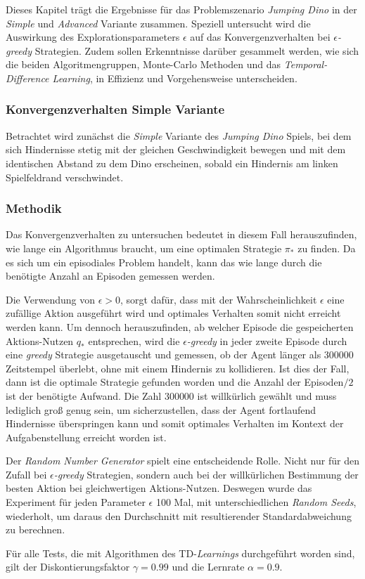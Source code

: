 Dieses Kapitel trägt die Ergebnisse für das Problemszenario \textit{Jumping Dino} in der \textit{Simple} und \textit{Advanced} Variante zusammen. Speziell untersucht wird die Auswirkung des Explorationsparameters $\epsilon$ auf das Konvergenzverhalten bei $\epsilon$\textit{-greedy} Strategien. Zudem sollen Erkenntnisse darüber gesammelt werden, wie sich die beiden Algoritmengruppen, Monte-Carlo Methoden und das \textit{Temporal-Difference Learning}, in Effizienz und Vorgehensweise unterscheiden.


\subsubsection{Konvergenzverhalten Simple Variante}\label{sec:resJumpSimple}
Betrachtet wird zunächst die \textit{Simple} Variante des \textit{Jumping Dino} Spiels, bei dem sich Hindernisse stetig mit der gleichen Geschwindigkeit bewegen und mit dem identischen Abstand zu dem Dino erscheinen, sobald ein Hindernis am linken Spielfeldrand verschwindet.

\subsubsection*{Methodik}
 Das Konvergenzverhalten zu untersuchen bedeutet in diesem Fall herauszufinden, wie lange ein Algorithmus braucht, um eine optimalen Strategie $\pi_*$ zu finden. Da es sich um ein episodiales Problem handelt, kann das \glqq wie lange\grqq{} durch die benötigte Anzahl an Episoden gemessen werden. 
\par
Die Verwendung von $\epsilon > 0$, sorgt dafür, dass mit der Wahrscheinlichkeit $\epsilon$ eine zufällige Aktion ausgeführt wird und optimales Verhalten somit nicht erreicht werden kann. Um dennoch herauszufinden, ab welcher Episode die gespeicherten Aktions-Nutzen $q_*$ entsprechen, wird die $\epsilon$\textit{-greedy} in jeder zweite Episode durch eine \textit{greedy} Strategie ausgetauscht und gemessen, ob der Agent länger als 300000 Zeitstempel überlebt, ohne mit einem Hindernis zu kollidieren. Ist dies der Fall, dann ist die optimale Strategie gefunden worden und die Anzahl der Episoden$/2$ ist der benötigte Aufwand. Die Zahl 300000 ist willkürlich gewählt und muss lediglich groß genug sein, um sicherzustellen, dass der Agent fortlaufend Hindernisse überspringen kann und somit optimales Verhalten im Kontext der Aufgabenstellung erreicht worden ist.  
\par 
Der \textit{Random Number Generator} spielt eine entscheidende Rolle. Nicht nur für den Zufall bei $\epsilon$\textit{-greedy} Strategien, sondern auch bei der willkürlichen Bestimmung der besten Aktion bei gleichwertigen Aktions-Nutzen. Deswegen wurde das Experiment für jeden Parameter $\epsilon$ 100 Mal, mit unterschiedlichen \textit{Random Seeds}, wiederholt, um daraus den Durchschnitt mit resultierender Standardabweichung zu berechnen.
\par 
Für alle Tests, die mit Algorithmen des TD-\textit{Learnings} durchgeführt worden sind, gilt der Diskontierungsfaktor $\gamma = 0.99$ und die Lernrate $\alpha = 0.9$.
\par 

